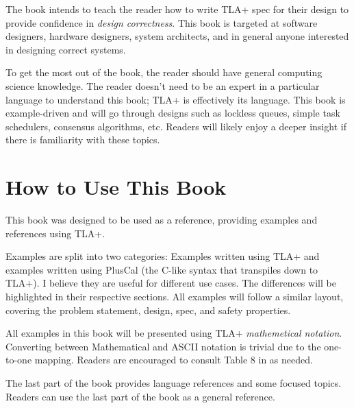 The book intends to teach the reader how to write TLA+ spec for their design to
provide confidence in \textit{design correctness}. This book is targeted at
software designers, hardware designers, system architects, and in general anyone
interested in designing correct systems.\newline 

To get the most out of the book, the reader should have general computing
science knowledge. The reader doesn't need to be an expert in a particular
language to understand this book; TLA+ is effectively its language. This book is
example-driven and will go through designs such as lockless queues, simple
task schedulers, consensus algorithms, etc. Readers will likely enjoy a deeper
insight if there is familiarity with these topics.

\section{How to Use This Book}

This book was designed to be used as a reference, providing examples
and references using TLA+.\newline

Examples are split into two categories: Examples written using TLA+ and
examples written using PlusCal (the C-like syntax that transpiles down to TLA+).
I believe they are useful for different use cases. The differences will
be highlighted in their respective sections. All examples will follow a
similar layout, covering the problem statement, design, spec, and safety
properties.\newline

All examples in this book will be presented using TLA+
\textit{mathemetical notation}. Converting between Mathematical and ASCII
notation is trivial due to the one-to-one mapping. Readers are encouraged to
consult Table 8 in \cite{ss} as needed.\newline

The last part of the book provides language references and some focused topics.
Readers can use the last part of the book as a general reference. 
